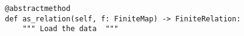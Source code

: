 \par\begin{minipage}{60ex}
\begin{verbatim}
@abstractmethod
def as_relation(self, f: FiniteMap) -> FiniteRelation:
    """ Load the data  """
\end{verbatim}
\end{minipage}\par